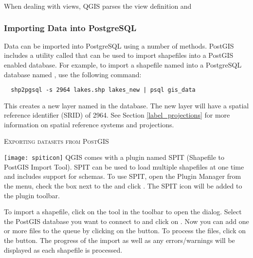 When dealing with views, QGIS parses the view definition and

\subsubsection{Importing Data into PostgreSQL}\label{sec:loading_postgis_data}

Data can be imported into PostgreSQL using a number of methods. PostGIS
includes a utility called  that can be used to import shapefiles into
a PostGIS enabled database. For example, to import a shapefile named
into a PostgreSQL database named , use the following command:

\begin{verbatim} 
  shp2pgsql -s 2964 lakes.shp lakes_new | psql gis_data
\end{verbatim}

This creates a new layer named  in the
 database. The
new layer will have a spatial reference identifier (SRID) of 2964. See Section 
\ref{label_projections} for more information on spatial reference systems and
projections.
\begin{Tip}
\caption{\textsc{Exporting datasets from PostGIS}}
\end{Tip}

\texttt{[image: spiticon]} QGIS comes with a
plugin named 
SPIT (Shapefile to PostGIS Import Tool).
SPIT can be used to load multiple shapefiles at one time and includes support
for schemas. To use SPIT, open the Plugin Manager from the 
menu, check the box next to the  and click . The SPIT
icon will be added to the plugin toolbar. 

To import a shapefile, click on the  tool in the 
toolbar to open the 
 dialog. Select the PostGIS database 
you want to connect to and click on . Now you can add one or more 
files to the queue by clicking on the  button. To process the files, 
click on the  button. The progress of the import as well as any 
errors/warnings will be displayed as each shapefile is processed.

